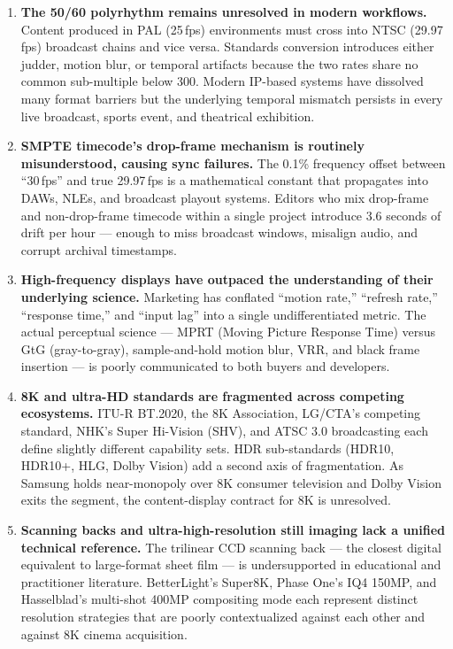 \documentclass[11pt,letterpaper]{article}
\begin{document}
\begin{enumerate}[leftmargin=*, label=\textbf{\arabic*.}]
  \item \textbf{The 50/60 polyrhythm remains unresolved in modern workflows.}
  Content produced in PAL (25\,fps) environments must cross into NTSC (29.97\,fps) broadcast chains
  and vice versa. Standards conversion introduces either judder, motion blur, or temporal artifacts
  because the two rates share no common sub-multiple below 300. Modern IP-based systems have
  dissolved many format barriers but the underlying temporal mismatch persists in every live
  broadcast, sports event, and theatrical exhibition.

  \item \textbf{SMPTE timecode's drop-frame mechanism is routinely misunderstood, causing sync failures.}
  The 0.1\% frequency offset between ``30\,fps'' and true 29.97\,fps is a mathematical constant that
  propagates into DAWs, NLEs, and broadcast playout systems. Editors who mix drop-frame and
  non-drop-frame timecode within a single project introduce 3.6 seconds of drift per hour --- enough
  to miss broadcast windows, misalign audio, and corrupt archival timestamps.

  \item \textbf{High-frequency displays have outpaced the understanding of their underlying science.}
  Marketing has conflated ``motion rate,'' ``refresh rate,'' ``response time,'' and ``input lag'' into
  a single undifferentiated metric. The actual perceptual science --- MPRT (Moving Picture Response
  Time) versus GtG (gray-to-gray), sample-and-hold motion blur, VRR, and black frame insertion --- is
  poorly communicated to both buyers and developers.

  \item \textbf{8K and ultra-HD standards are fragmented across competing ecosystems.}
  ITU-R BT.2020, the 8K Association, LG/CTA's competing standard, NHK's Super Hi-Vision (SHV), and
  ATSC 3.0 broadcasting each define slightly different capability sets. HDR sub-standards
  (HDR10, HDR10+, HLG, Dolby Vision) add a second axis of fragmentation. As Samsung holds near-monopoly
  over 8K consumer television and Dolby Vision exits the segment, the content-display contract for
  8K is unresolved.

  \item \textbf{Scanning backs and ultra-high-resolution still imaging lack a unified technical reference.}
  The trilinear CCD scanning back --- the closest digital equivalent to large-format sheet film --- is
  undersupported in educational and practitioner literature. BetterLight's Super8K, Phase One's IQ4 150MP,
  and Hasselblad's multi-shot 400MP compositing mode each represent distinct resolution strategies that
  are poorly contextualized against each other and against 8K cinema acquisition.
\end{enumerate}
\end{document}

